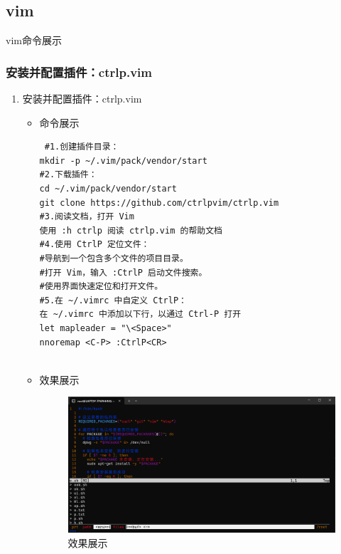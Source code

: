 \documentclass[UTF8]{ctexart}
\begin{document}
  \subsection{vim}
  {\color{blue}vim命令展示}




\subsubsection{安装并配置插件：ctrlp.vim}

\begin{enumerate}
  \item 安装并配置插件：ctrlp.vim
  \begin{itemize}
  \item 命令展示
  \begin{verbatim}
 #1.创建插件目录：
mkdir -p ~/.vim/pack/vendor/start
#2.下载插件：
cd ~/.vim/pack/vendor/start
git clone https://github.com/ctrlpvim/ctrlp.vim
#3.阅读文档，打开 Vim
使用 :h ctrlp 阅读 ctrlp.vim 的帮助文档
#4.使用 CtrlP 定位文件：
#导航到一个包含多个文件的项目目录。
#打开 Vim，输入 :CtrlP 启动文件搜索。
#使用界面快速定位和打开文件。
#5.在 ~/.vimrc 中自定义 CtrlP：
在 ~/.vimrc 中添加以下行，以通过 Ctrl-P 打开
let mapleader = "\<Space>"
nnoremap <C-P> :CtrlP<CR>


  \end{verbatim}

  \item 效果展示
  \begin{figure}[H]
    \centering
    \includegraphics[width=\textwidth]{21} %
    \caption{效果展示}
  
  \end{figure}
\end{itemize}
\end{enumerate}
\end{document}

